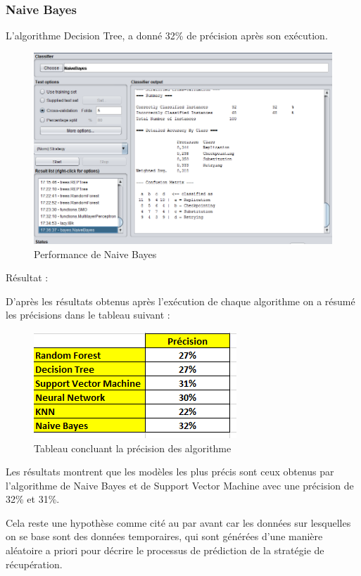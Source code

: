 \subsubsection{Naive Bayes}

L'algorithme Decision Tree, a donné 32\% de précision après son exécution.

\begin{figure}[H]
\begin{center}
\includegraphics[width=0.8\linewidth]{images/perfNB.PNG}
\end{center}
\caption{Performance de Naive Bayes}
\label{fig:21}
\end{figure}

Résultat : 

D'après les résultats obtenus après l'exécution de chaque algorithme on a résumé les précisions dans le tableau suivant : 

\begin{figure}[H]
\begin{center}
\includegraphics[width=0.7\linewidth]{images/stat.PNG}
\end{center}
\caption{Tableau concluant la précision des algorithme}
\label{fig:22}
\end{figure}

Les résultats montrent que les modèles les plus précis sont ceux obtenus par l'algorithme de Naive Bayes et  de Support Vector Machine avec une précision de 32\% et 31\%.

Cela reste une hypothèse comme cité au par avant car les données sur lesquelles on se base sont des données temporaires, qui sont générées d'une manière aléatoire a priori pour décrire le processus de prédiction de la stratégie de récupération. 

